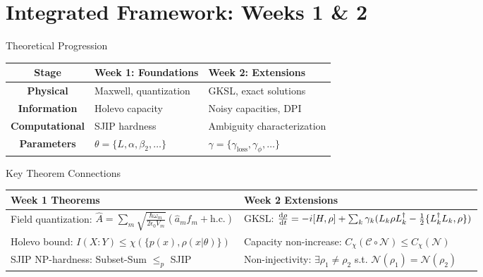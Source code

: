 \documentclass{beamer}
\theoremstyle{definition}
\theoremstyle{plain}
\begin{document}
\section{Integrated Framework: Weeks 1 \& 2}

\begin{frame}{Theoretical Progression}
    \centering
    \tiny
    \begin{tabular}{|c|p{4cm}|p{4cm}|}
        \hline
        \textbf{Stage} & \textbf{Week 1: Foundations} & \textbf{Week 2: Extensions} \\
        \hline
        \textbf{Physical} & Maxwell, quantization & GKSL, exact solutions \\
        \hline
        \textbf{Information} & Holevo capacity & Noisy capacities, DPI \\
        \hline
        \textbf{Computational} & SJIP hardness & Ambiguity characterization \\
        \hline
        \textbf{Parameters} & $\theta = \{L,\alpha,\beta_2,\ldots\}$ & $\gamma = \{\gamma_{\text{loss}},\gamma_\phi,\ldots\}$ \\
        \hline
    \end{tabular}
    
    \vspace{0.3cm}
    
    \begin{block}{Key Theorem Connections}
        \tiny
        \begin{tabular}{p{} p{}}
            \hline
            \textbf{Week 1 Theorems} & \textbf{Week 2 Extensions} \\
            \hline
            Field quantization: $\hat{A} = \sum_m \sqrt{\frac{\hbar\omega_m}{2\epsilon_0 V_m}} (\hat{a}_m f_m + \text{h.c.})$ & GKSL: $\dv{\rho}{t} = -i[H,\rho] + \sum_k \gamma_k (L_k \rho L_k^\dagger - \frac{1}{2}\{L_k^\dagger L_k, \rho\})$ \\
            \hline
            Holevo bound: $I(X:Y) \leq \chi(\{p(x), \rho(x|\theta)\})$ & Capacity non-increase: $C_\chi(\mathcal{C} \circ \mathcal{N}) \leq C_\chi(\mathcal{N})$ \\
            \hline
            SJIP NP-hardness: Subset-Sum $\leq_p$ SJIP & Non-injectivity: $\exists \rho_1 \neq \rho_2$ s.t. $\mathcal{N}(\rho_1) = \mathcal{N}(\rho_2)$ \\
            \hline
        \end{tabular}
    \end{block}
\end{frame}
\end{document}
